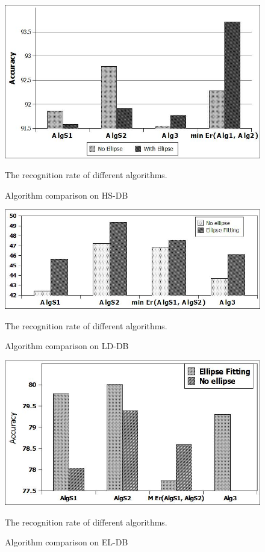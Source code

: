 \documentclass[preprint,10pt,5p,twocolumn]{elsarticle}
\begin{document}
 \begin{figure}
	\centering		
	 \includegraphics[scale=0.4]{images/testAlg.jpg}
	 	\caption{Algorithm comparison on HS-DB} The recognition rate of different algorithms. 
	 	\label{fig:test1}
\end{figure} 




\begin{figure}
	\centering		
	 \includegraphics[scale=0.4]{images/LDAlg.jpg}
	 	\caption{Algorithm comparison on LD-DB} The recognition rate of different algorithms. 
	 	\label{fig:testLD}
\end{figure} 

\begin{figure}
	\centering		
	 \includegraphics[scale=0.4]{images/AlgEL.jpg}
	 	\caption{Algorithm comparison on EL-DB} The recognition rate of different algorithms. 
	 	\label{fig:testEL}
\end{figure} 
\end{document}
